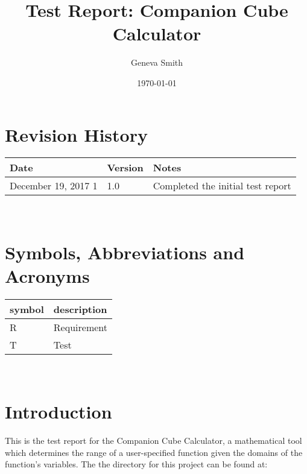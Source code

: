 \documentclass[12pt, titlepage]{article}
\begin{document}
\title{Test Report: Companion Cube Calculator} 
\author{Geneva Smith}
\date{\today}
	
\maketitle


\section{Revision History}

\begin{tabularx}{\textwidth}{p{3cm}p{2cm}X}
\toprule {\bf Date} & {\bf Version} & {\bf Notes}\\
\midrule
December 19, 2017 1 & 1.0 & Completed the initial test report\\
\bottomrule
\end{tabularx}

~\newpage

\section{Symbols, Abbreviations and Acronyms}

\renewcommand{\arraystretch}{1.2}
\begin{tabular}{l l} 
  \toprule		
  \textbf{symbol} & \textbf{description}\\
  \midrule 
  R & Requirement \\
  T & Test\\
  \bottomrule
\end{tabular}\\

\newpage

\tableofcontents

\listoftables %


\newpage


\section{Introduction}
This is the test report for the Companion Cube Calculator, a mathematical 
tool which determines the range of a user-specified function given the domains 
of the function's variables. The the directory for this project can be found at:
\end{document}
